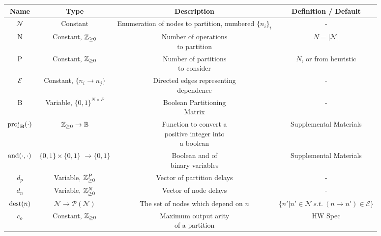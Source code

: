 \begin{table*}
  \begin{tabularx}{\textwidth}{cccc}
    \toprule
    \textbf{Name} & \textbf{Type} & \textbf{Description} & \textbf{Definition / Default}\\
    \midrule
    $\mathcal{N}$ & Constant & \ccell{Enumeration of nodes to\\ partition, numbered $\{n_i\}_i$} & - \\[0.5cm]
    N & Constant, $\mathbb{Z}_{\ge 0}$ & \ccell{Number of operations\\ to partition} & $N = |\mathcal{N}|$\\[0.5cm]
    P & Constant, $\mathbb{Z}_{\ge 0}$ & \ccell{Number of partitions\\ to consider} & $N$, or from heuristic \\[0.5cm]
    $\mathcal{E}$ & Constant, $\{n_i \to n_j\}$& \ccell{Directed edges representing\\ dependence} & - \\[0.5cm]
    B & Variable, $\{0, 1\}^{N \times P}$ & \ccell{Boolean Partitioning\\ Matrix}& - \\[0.5cm]
    $\text{proj}_\mathbf{B}(\cdot)$ & $\mathbb{Z}_{\ge 0} \to \mathbb{B}$ & \ccell{Function to convert a\\ positive integer into\\ a boolean}& Supplemental Materials\\[0.5cm]
    $\operatorname*{and}(\cdot, \cdot)$ & \ccell{$\{0, 1\} \times \{0, 1\}$\\$ \to \{0, 1\}$} & \ccell{Boolean and of\\ binary variables} & Supplemental Materials \\ [0.5cm]
    $d_p$ & Variable, $\mathbb{Z}_{\ge 0}^P$ & Vector of partition delays & - \\[0.5cm]
    $d_n$ & Variable, $\mathbb{Z}_{\ge 0}^N$ & Vector of node delays & - \\[0.5cm]
    $\operatorname*{dest}(n)$ & $\mathcal{N} \to \mathcal{P}(\mathcal{N})$& \ccell{The set of nodes\\ which depend on $n$} & $\{n' | n' \in \mathcal{N}\ s.t.\ (n \to n') \in \mathcal{E}\}$\\[0.5cm]
    $c_o$ & Constant, $\mathbb{Z}_{\ge 0}$ & \ccell{Maximum output arity\\ of a partition} & HW Spec \\[0.5cm]

\end{tabularx}
\end{table*}
